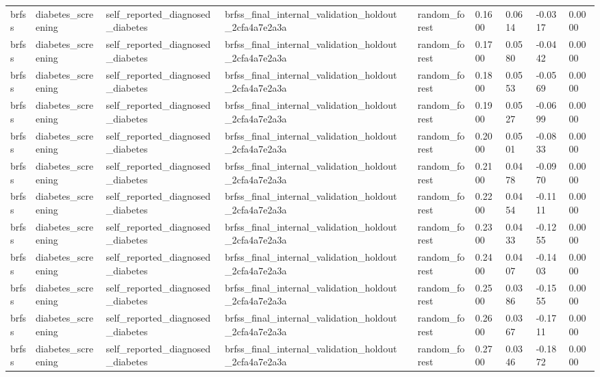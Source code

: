 \begin{tabular}{llllllllll}
brfss & diabetes\_screening & self\_reported\_diagnosed\_diabetes & brfss\_final\_internal\_validation\_holdout\_2cfa4a7e2a3a &  & random\_forest & 0.1600 & 0.0614 & -0.0317 & 0.0000 \\
brfss & diabetes\_screening & self\_reported\_diagnosed\_diabetes & brfss\_final\_internal\_validation\_holdout\_2cfa4a7e2a3a &  & random\_forest & 0.1700 & 0.0580 & -0.0442 & 0.0000 \\
brfss & diabetes\_screening & self\_reported\_diagnosed\_diabetes & brfss\_final\_internal\_validation\_holdout\_2cfa4a7e2a3a &  & random\_forest & 0.1800 & 0.0553 & -0.0569 & 0.0000 \\
brfss & diabetes\_screening & self\_reported\_diagnosed\_diabetes & brfss\_final\_internal\_validation\_holdout\_2cfa4a7e2a3a &  & random\_forest & 0.1900 & 0.0527 & -0.0699 & 0.0000 \\
brfss & diabetes\_screening & self\_reported\_diagnosed\_diabetes & brfss\_final\_internal\_validation\_holdout\_2cfa4a7e2a3a &  & random\_forest & 0.2000 & 0.0501 & -0.0833 & 0.0000 \\
brfss & diabetes\_screening & self\_reported\_diagnosed\_diabetes & brfss\_final\_internal\_validation\_holdout\_2cfa4a7e2a3a &  & random\_forest & 0.2100 & 0.0478 & -0.0970 & 0.0000 \\
brfss & diabetes\_screening & self\_reported\_diagnosed\_diabetes & brfss\_final\_internal\_validation\_holdout\_2cfa4a7e2a3a &  & random\_forest & 0.2200 & 0.0454 & -0.1111 & 0.0000 \\
brfss & diabetes\_screening & self\_reported\_diagnosed\_diabetes & brfss\_final\_internal\_validation\_holdout\_2cfa4a7e2a3a &  & random\_forest & 0.2300 & 0.0433 & -0.1255 & 0.0000 \\
brfss & diabetes\_screening & self\_reported\_diagnosed\_diabetes & brfss\_final\_internal\_validation\_holdout\_2cfa4a7e2a3a &  & random\_forest & 0.2400 & 0.0407 & -0.1403 & 0.0000 \\
brfss & diabetes\_screening & self\_reported\_diagnosed\_diabetes & brfss\_final\_internal\_validation\_holdout\_2cfa4a7e2a3a &  & random\_forest & 0.2500 & 0.0386 & -0.1555 & 0.0000 \\
brfss & diabetes\_screening & self\_reported\_diagnosed\_diabetes & brfss\_final\_internal\_validation\_holdout\_2cfa4a7e2a3a &  & random\_forest & 0.2600 & 0.0367 & -0.1711 & 0.0000 \\
brfss & diabetes\_screening & self\_reported\_diagnosed\_diabetes & brfss\_final\_internal\_validation\_holdout\_2cfa4a7e2a3a &  & random\_forest & 0.2700 & 0.0346 & -0.1872 & 0.0000 \\

\end{tabular}
